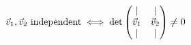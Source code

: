 \documentclass[preview]{standalone}
\begin{document}
\begin{align*}
\special{dvisvgm:raw <g id='unique000'>}\vec{v}_1, \vec{v}_2 \text{ independent} \iff \det\begin{pmatrix}| & |\\ \vec{v}_1 & \vec{v}_2\\ | & |\end{pmatrix} \neq 0\special{dvisvgm:raw </g>}
\end{align*}
\end{document}
